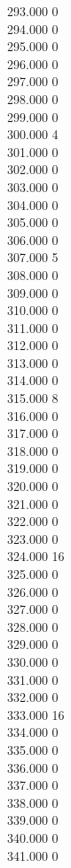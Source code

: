 { 293.000	0 \\
 294.000	0 \\
 295.000	0 \\
 296.000	0 \\
 297.000	0 \\
 298.000	0 \\
 299.000	0 \\
 300.000	4 \\
 301.000	0 \\
 302.000	0 \\
 303.000	0 \\
 304.000	0 \\
 305.000	0 \\
 306.000	0 \\
 307.000	5 \\
 308.000	0 \\
 309.000	0 \\
 310.000	0 \\
 311.000	0 \\
 312.000	0 \\
 313.000	0 \\
 314.000	0 \\
 315.000	8 \\
 316.000	0 \\
 317.000	0 \\
 318.000	0 \\
 319.000	0 \\
 320.000	0 \\
 321.000	0 \\
 322.000	0 \\
 323.000	0 \\
 324.000	16 \\
 325.000	0 \\
 326.000	0 \\
 327.000	0 \\
 328.000	0 \\
 329.000	0 \\
 330.000	0 \\
 331.000	0 \\
 332.000	0 \\
 333.000	16 \\
 334.000	0 \\
 335.000	0 \\
 336.000	0 \\
 337.000	0 \\
 338.000	0 \\
 339.000	0 \\
 340.000	0 \\
 341.000	0 \\
}
